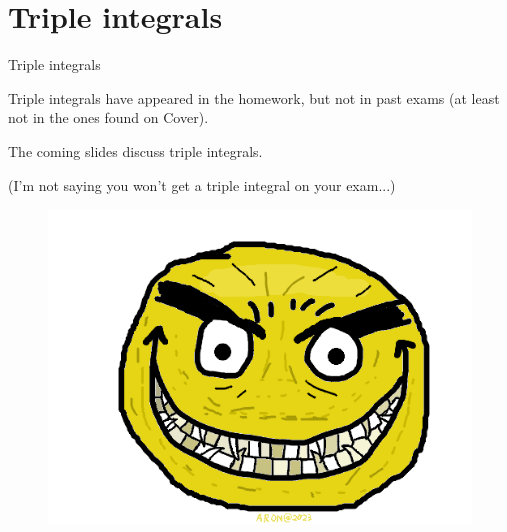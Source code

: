 \section{Triple integrals}
\begin{frame}{Triple integrals}
    \textbf{}

    Triple integrals have appeared in the homework, but not in past exams (at least not in the ones found on Cover).

    The coming slides discuss triple integrals.

\vspace{3mm}
    \scriptsize (I'm not saying you won't get a triple integral on your exam...)

    \begin{figure}[b]\includegraphics{smile}\centering\end{figure}
\end{frame}
